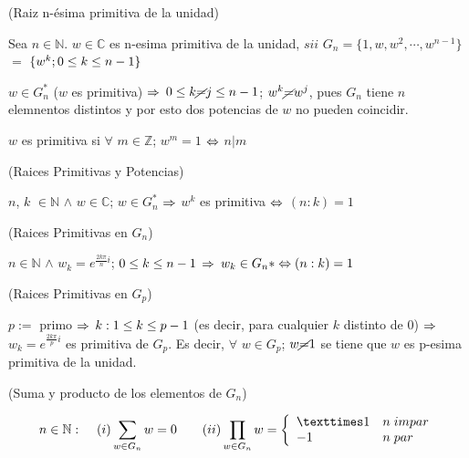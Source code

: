 \documentclass[10pt]{article}
\begin{document}
\begin{defi}(Raiz n-ésima primitiva de la unidad)

Sea $n \in \mathbb{N}$. $w \in \mathbb{C}$ es n-esima primitiva de la unidad, $sii$ $G_n = \lbrace 1,w,w^2, \cdots, w^{n-1}\rbrace$ $=$ $\lbrace w^k ; 0 \leq k \leq n-1\rbrace$
\end{defi}
 
\begin{obs}
 $w \in G_n^*$ ($w$ es primitiva) $\Rightarrow$ $0 \leq k \cancel{=} j \leq n-1$; $w^k \cancel{=} w^j$, pues $G_n$ tiene $n$ elemnentos distintos y por esto dos potencias de $w$ no pueden coincidir.  
\end{obs}


\begin{propo}
 $w$ es primitiva si $\forall$ $m \in \mathbb{Z}$; $w^m=1$ $\Leftrightarrow$ $n|m$
\end{propo}


\begin{cor}(Raices Primitivas y Potencias)

$n$, $k$ $\in \mathbb{N}$ $\land$ $w \in \mathbb{C}$; $w \in G_n^*$ $\Rightarrow$ $w^k$ es primitiva $\Leftrightarrow$ $(n:k) = 1$ 
\end{cor}

\begin{cor}(Raices Primitivas en $G_n$)

$n \in \mathbb{N}$ $\land$ $w_k = e^{\frac{2 k \pi }{n} i }$; $ 0 \leq k \leq n-1$ $\Rightarrow$ $w_k \in G_n* \Leftrightarrow (n:k) = 1$
\end{cor}

\begin{cor}
(Raices Primitivas en $G_p$)

$p :=$ primo $\Rightarrow$ $k : 1 \leq k \leq p-1$ (es decir, para cualquier $k$ distinto de $0$) $\Rightarrow$ $w_k = e^{\frac{2 k \pi }{p} i }$ es primitiva de $G_p$. Es decir, $\forall$ $w \in G_p$; $w \cancel{=} 1$ se tiene que $w$ es p-esima primitiva de la unidad.
\end{cor}

\begin{prop}(Suma y producto de los elementos de $G_n$)

\[n \in \mathbb{N} :
\hspace{0.4cm}
(i) \sum_{w \in G_n}^{} w = 0 
\hspace{0.7cm}
 (ii) \prod_{w \in G_n}^{} w = \left\lbrace \begin{array}{ll}
                                               × 1 & n \hspace{0.1cm} impar \\
                                                 -1 & n \hspace{0.1cm} par
                                              \end{array}\right.\]
\end{prop}
\end{document}
